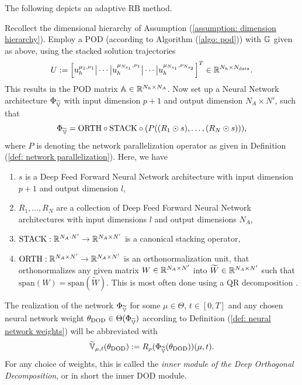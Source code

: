 The following depicts an adaptive RB method. 
\begin{definition} 
    \label{def: DOD}
    Recollect the dimensional hierarchy of Assumption (\ref{assumption: dimension hierarchy}).
    Employ a POD (according to Algorithm (\ref{algo: pod})) with $\mathbb{G}$
    given as above, using
    the stacked solution trajectories
    \begin{equation*}
        U := \left[u_h^{\mu_1, \nu_1} \big\vert \cdots \big\vert u_h^{\mu_{N_{s_1}}, \nu_1} \big\vert \cdots \big\vert 
        u_h^{\mu_{N_{s_1}}, \nu_{N_{s_2}}}\right]^T \in \mathbb{R}^{N_h \times N_\text{data}}.
    \end{equation*}
    This results in the POD matrix $\mathbb{A} \in \mathbb{R}^{N_h \times N_A}$.
    Now set up a Neural Network architecture 
    $\Phi_{\widetilde{\mathbb{V}}}$ with input dimension $p + 1$ and output dimension $N_A \times N'$,
    such that
    \begin{equation*}
        \Phi_{\widetilde{\mathbb{V}}} = \text{ORTH} \circ \text{STACK} \circ (P((R_1 \odot s), \dots, (R_N \odot s))),
    \end{equation*}
    where $P$ is denoting the network parallelization operator as given in Definition (\ref{def: network parallelization}).
    Here, we have
    \begin{enumerate}
        \item $s$ is a Deep Feed Forward Neural Network architecture with input dimension $p + 1$ and output dimension $l$,
        \item $R_1, \dots, R_N$ are a collection of Deep Feed Forward Neural Network architectures
        with input dimensions $l$ and output dimensions $N_A$,
        \item $\text{STACK}: \mathbb{R}^{N_A \cdot N'} \to \mathbb{R}^{N_A \times N'}$ is a canonical stacking operator, 
        \item $\text{ORTH}: \mathbb{R}^{N_A \times N'} \to \mathbb{R}^{N_A \times N'}$ is an orthonormalization unit, that orthonormalizes
        any given matrix $W \in \mathbb{R}^{N_A \times N'}$ into $\widetilde{W} \in \mathbb{R}^{N_A \times N'}$ such that 
        $\text{span}(W) = \text{span}(\tilde W)$. This is most often done using a QR decomposition \cite{golubvanloan2013}. 
    \end{enumerate}
    The realization of the network $\Phi_{\widetilde{\mathbb{V}}}$ for some $\mu \in \Theta$, $t \in [0, T]$ and
    any chosen neural network weight $\theta_\text{DOD} \in \Theta(\Phi_{\widetilde{\mathbb{V}}})$ 
    according to Definition (\ref{def: neural network weights}) will be abbreviated with
    \begin{equation} \label{eq: inner module DOD}
        \widetilde{\mathbb{V}}_{\mu, t}(\theta_\text{DOD}) := R_\rho(\Phi_{\widetilde{\mathbb{V}}}(\theta_\text{DOD}))(\mu, t).
    \end{equation}
    For any choice of weights, this is called the \emph{inner module of the Deep Orthogonal Decomposition}, or in short 
    the inner DOD module.


\end{definition}
